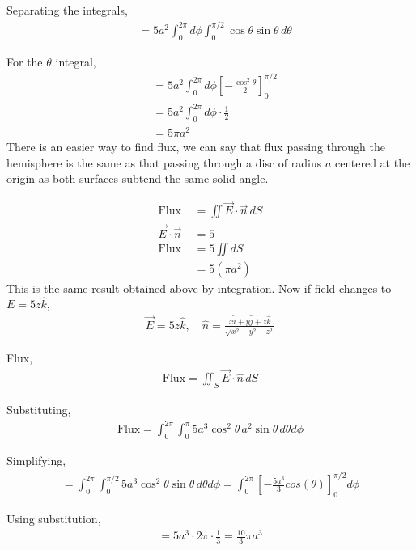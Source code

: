 \documentclass{article}
\begin{document}
Separating the integrals,
\begin{align*}
&= 5a^2 \int_{0}^{2\pi} d\phi \int_{0}^{\pi/2} \cos{\theta} \sin{\theta} \, d\theta
\end{align*}

For the $\theta$ integral,
\begin{align*}
&= 5a^2 \int_{0}^{2\pi} d\phi \left[ -\frac{\cos^2{\theta}}{2} \right]_{0}^{\pi/2} \\
&= 5a^2 \int_{0}^{2\pi} d\phi \cdot \frac{1}{2} \\
&= 5\pi a^2
\end{align*}
There is an easier way to find flux, we can say that flux passing through the hemisphere is the same as that passing through a disc of radius $a$ centered at
the origin as both surfaces subtend the same solid angle.

\begin{align*}
\text{Flux} &= \iint \vec{E} \cdot \vec{n} \, dS \\
\vec{E} \cdot \vec{n} & = 5 \\
\text{Flux } &= 5 \iint dS \\
& = 5 (\pi a^2)
\end{align*}
This is the same result obtained above by integration. Now if field changes to $E = 5z\hat{k}$,
\begin{align*}
\vec{E} = 5z \hat{k}, \quad \hat{n} = \frac{x \hat{i} + y \hat{j} + z \hat{k}}{\sqrt{x^2 + y^2 + z^2}}
\end{align*}

Flux,
\begin{align*}
\text{Flux} = \iint_S \vec{E} \cdot \hat{n} \, dS
\end{align*}

Substituting,
\begin{align*}
\text{Flux} = \int_0^{2\pi} \int_0^{\pi} 5a^3 \cos^2\theta \, a^2 \sin\theta \, d\theta d\phi
\end{align*}

Simplifying,
\begin{align*}
= \int_0^{2\pi}  \int_0^{\pi/2} 5a^3 \cos^2\theta \sin\theta \, d\theta d\phi
= \int_0^{2\pi}   \left[-\frac{5a^3}{3} cos(\theta)\right]_0^{\pi/2} d\phi
\end{align*}

Using substitution,
\begin{align*}
= 5a^3 \cdot 2\pi \cdot \frac{1}{3}
= \frac{10}{3}\pi a^3
\end{align*}

\vspace{1cm}
\end{document}
